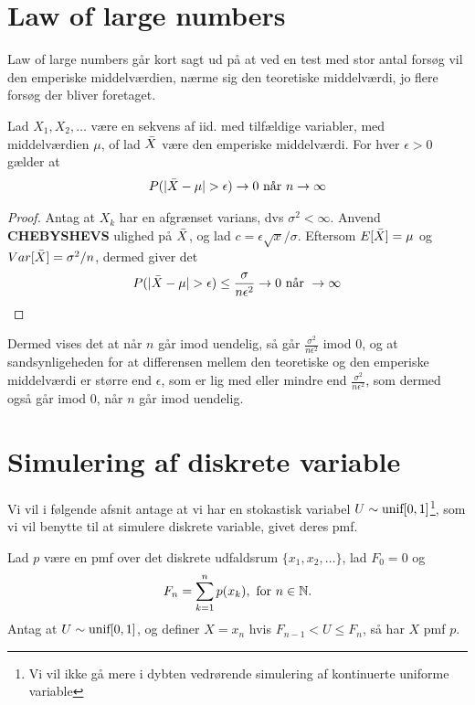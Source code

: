 \section{Law of large numbers}
Law of large numbers går kort sagt ud på at ved en test med stor antal forsøg vil den emperiske middelværdien, nærme sig den teoretiske middelværdi, jo flere forsøg der bliver foretaget.
\begin{thm}%
    Lad $X_1, X_2, \dots$ være en sekvens af iid. med tilfældige variabler, med middelværdien $\mu$, of lad $\Bar{X}$ være den emperiske middelværdi. For hver $\epsilon>0$ gælder at
    \begin{align*}
        P(|\Bar{X}-\mu|>\epsilon) \rightarrow 0 \text{ når } n \rightarrow \infty
    \end{align*}
\end{thm}
\begin{proof}
    Antag at $X_k$ har en afgrænset varians, dvs $\sigma^2<\infty$. Anvend \textbf{CHEBYSHEVS} ulighed på $\Bar{X}$, og lad $c=\epsilon \sqrt{x}/\sigma$. Eftersom $E[\Bar{X}]=\mu$ og $Var[\Bar{X}]=\sigma^2/n$, dermed giver det
    \begin{align*}
        P(|\Bar{X}-\mu| > \epsilon) \leq \frac{\sigma}{n\epsilon^2} \rightarrow 0 \text{ når } \rightarrow \infty
    \end{align*}
\end{proof}
Dermed vises det at når $n$ går imod uendelig, så går $\frac{\sigma^2}{n\epsilon^2}$ imod $0$, og at sandsynligeheden for at differensen mellem den teoretiske og den emperiske middelværdi er større end $\epsilon$, som er lig med eller mindre end $\frac{\sigma^2}{n\epsilon^2}$, som dermed også går imod 0, når $n$ går imod uendelig.

\section{Simulering af diskrete variable} 
Vi vil i følgende afsnit antage at vi har en stokastisk variabel $U \sim \textnormal{unif}[0,1]$\footnote{Vi vil ikke gå mere i dybten vedrørende simulering af kontinuerte uniforme variable}, som vi vil benytte til at simulere diskrete variable, givet deres pmf.
\begin{thm} \label{thm:simuleringAfDiskreteVaraible}
    Lad $p$ være en pmf over det diskrete udfaldsrum $\{x_1, x_2, \ldots\}$, lad $F_0 = 0$ og
    \begin{equation*}
        F_n = \sum^n_{k = 1} p(x_k), \text{ for } n \in \mathbb{N}.
    \end{equation*}
    Antag at $U \sim \textnormal{unif}[0, 1]$, og definer $X = x_n$ hvis $F_{n - 1} < U \leq F_n$, så har $X$ pmf $p$.
\end{thm}

